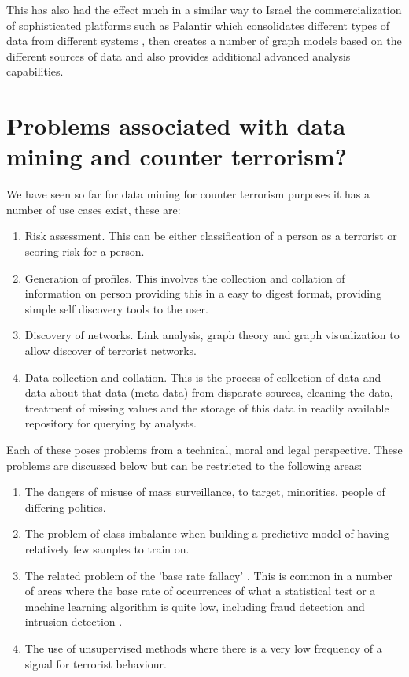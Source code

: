 This has also had the effect much in a similar way to Israel the commercialization of sophisticated platforms such as Palantir which consolidates different types of data from different systems \citep{soklakova2016technological}, then creates a number of graph models based on the different sources of data and also provides additional advanced analysis capabilities.

\section{Problems associated with data mining and counter terrorism?}

We have seen so far for data mining for counter terrorism purposes it has a number of use cases exist, these are:
\begin{enumerate}
\item Risk assessment. This can be either classification of a person as a terrorist   or scoring risk for a person.
\item Generation of profiles. This involves the collection and collation of information on person providing this in a  easy to digest format, providing simple self discovery tools to the user.
\item Discovery of networks. Link analysis, graph theory and graph visualization to allow discover of terrorist networks.
\item Data collection and collation. This is the process of collection of data and data about that data (meta data) from disparate sources, cleaning the data, treatment of missing values and the storage of this data in readily available repository for querying by analysts.
\end{enumerate}

Each of these poses problems from a technical, moral and legal perspective. These problems are discussed below but can be restricted to the following areas:
\begin{enumerate}
\item The dangers of misuse of mass surveillance, to target, minorities, people of differing politics.
\item The problem of class imbalance when building a predictive model of having relatively few samples to train on.
\item The related problem of the 'base rate fallacy' \citep{bar1980base}. This is common in a number of areas where the base rate of occurrences of what a statistical test or a machine learning algorithm is quite low, including fraud detection and intrusion detection \citep{axelsson2000base}.
\item The use of unsupervised methods where there is a very low frequency of a signal for terrorist behaviour.
\end{enumerate}

